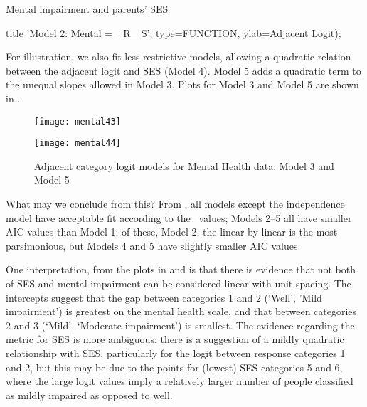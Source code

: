 \begin{Example}[mental4]{Mental impairment and parents' SES}
\begin{listing}
title 'Model 2: Mental = _R_  S';
   type=FUNCTION, ylab=Adjacent Logit);
\end{listing}

For illustration, we also fit less restrictive models,
allowing a quadratic relation between the adjacent logit and SES (Model 4).
Model 5 adds a quadratic term
to the unequal slopes allowed in Model 3.
Plots for Model 3 and Model 5 are shown in .


\begin{figure}[htb]
 \begin{minipage}[t]{.49\linewidth}
  \texttt{[image: mental43]}
 \end{minipage}%
 \hfill
 \begin{minipage}[t]{.49\linewidth}
  \texttt{[image: mental44]}
 \end{minipage}
 \caption{Adjacent category logit models for Mental Health data: Model 3 and Model 5}\label{fig:mental4b}
\end{figure}

What may we conclude from this?
From , all models except the independence model
have acceptable fit according to the \chisq\ values;
Models 2--5 all have smaller AIC values than Model 1;  of these,
Model 2, the linear-by-linear is the most parsimonious, but Models
4 and 5 have slightly smaller AIC values.

One interpretation, from the plots in  and 
is that there is evidence that not both of SES and mental impairment
can be considered linear with unit spacing.
The intercepts suggest that the gap between categories 1 and 2
(`Well', 'Mild impairment') is greatest on the mental health scale,
and that between categories 2 and 3 (`Mild', `Moderate impairment')
is smallest.
The evidence regarding the metric for SES is more ambiguous:
there is a suggestion of a mildly quadratic relationship with SES,
particularly for the logit between response categories 1 and 2,
but this may be due to the points for (lowest) SES categories 5 and 6,
where the large logit values imply
a relatively larger number of people
classified as mildly impaired as opposed to well.
\end{Example}
